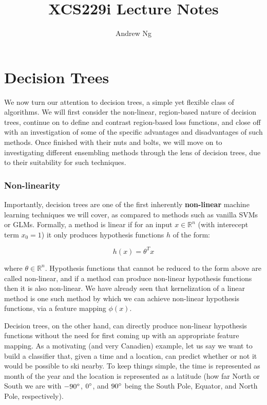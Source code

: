 \documentclass{article}
\begin{document}
\title{XCS229i Lecture Notes}
\author{Andrew Ng}
\date{}
\maketitle


\part*{Decision Trees}

We now turn our attention to decision trees, a simple yet flexible class of algorithms.  We will first consider the non-linear, region-based nature of decision trees, continue on to define and contrast region-based loss functions, and close off with an investigation of some of the specific advantages and disadvantages of such methods.  Once finished with their nuts and bolts, we will move on to investigating different ensembling methods through the lens of decision trees, due to their suitability for such techniques.  

\section{Non-linearity}

Importantly, decision trees are one of the first inherently {\bf non-linear} machine learning techniques we will cover, as compared to methods such as vanilla SVMs or GLMs.  Formally, a method is linear if for an input $x \in \mathbb{R}^n$ (with interecept term $x_0 = 1$) it only produces hypothesis functions $h$ of the form:

$$h(x) = \theta^T x$$

where $\theta \in \mathbb{R}^n$.  Hypothesis functions that cannot be reduced to the form above are called non-linear, and if a method can produce non-linear hypothesis functions then it is also non-linear.  We have already seen that kernelization of a linear method is one such method by which we can achieve non-linear hypothesis functions, via a feature mapping $\phi(x)$.

Decision trees, on the other hand, can directly produce non-linear hypothesis functions without the need for first coming up with an appropriate feature mapping.  As a motivating (and very Canadien) example, let us say we want to build a classifier that, given a time and a location, can predict whether or not it would be possible to ski nearby.  To keep things simple, the time is represented as month of the year and the location is represented as a latitude (how far North or South we are with $-90\degree$, $0\degree$, and $90\degree$ being the South Pole, Equator, and North Pole, respectively). 
\end{document}
